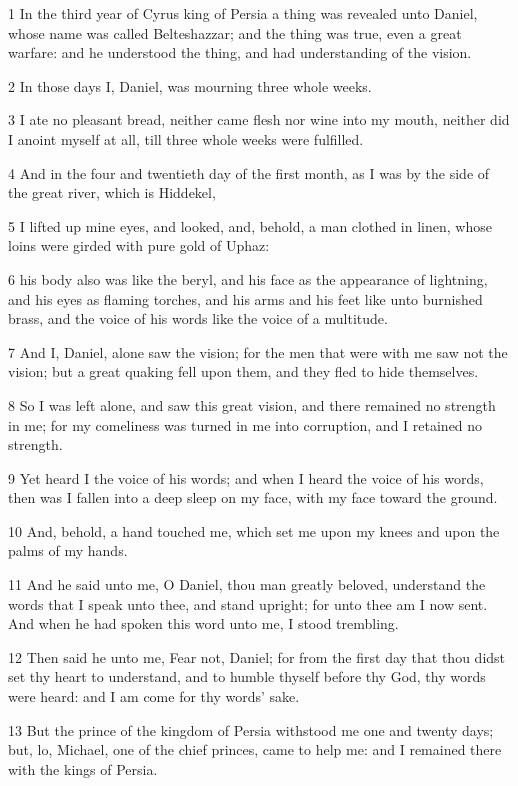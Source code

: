 \par 1 In the third year of Cyrus king of Persia a thing was revealed unto Daniel, whose name was called Belteshazzar; and the thing was true, even a great warfare: and he understood the thing, and had understanding of the vision.
\par 2 In those days I, Daniel, was mourning three whole weeks.
\par 3 I ate no pleasant bread, neither came flesh nor wine into my mouth, neither did I anoint myself at all, till three whole weeks were fulfilled.
\par 4 And in the four and twentieth day of the first month, as I was by the side of the great river, which is Hiddekel,
\par 5 I lifted up mine eyes, and looked, and, behold, a man clothed in linen, whose loins were girded with pure gold of Uphaz:
\par 6 his body also was like the beryl, and his face as the appearance of lightning, and his eyes as flaming torches, and his arms and his feet like unto burnished brass, and the voice of his words like the voice of a multitude.
\par 7 And I, Daniel, alone saw the vision; for the men that were with me saw not the vision; but a great quaking fell upon them, and they fled to hide themselves.
\par 8 So I was left alone, and saw this great vision, and there remained no strength in me; for my comeliness was turned in me into corruption, and I retained no strength.
\par 9 Yet heard I the voice of his words; and when I heard the voice of his words, then was I fallen into a deep sleep on my face, with my face toward the ground.
\par 10 And, behold, a hand touched me, which set me upon my knees and upon the palms of my hands.
\par 11 And he said unto me, O Daniel, thou man greatly beloved, understand the words that I speak unto thee, and stand upright; for unto thee am I now sent. And when he had spoken this word unto me, I stood trembling.
\par 12 Then said he unto me, Fear not, Daniel; for from the first day that thou didst set thy heart to understand, and to humble thyself before thy God, thy words were heard: and I am come for thy words' sake.
\par 13 But the prince of the kingdom of Persia withstood me one and twenty days; but, lo, Michael, one of the chief princes, came to help me: and I remained there with the kings of Persia.
